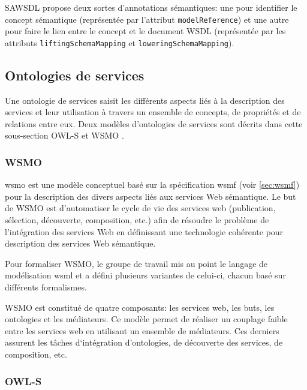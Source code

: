     \textsc{SAWSDL} propose deux sortes d'annotations sémantiques: une
    pour identifier le concept sémantique (représentée par l'attribut
    \texttt{modelReference}) et une autre pour faire le lien entre le
    concept et le document \textsc{WSDL} (représentée par les
    attributs \texttt{liftingSchemaMapping} et
    \texttt{loweringSchemaMapping}).

  \subsection{Ontologies de services}
  \label{sec:ont-serices}

  Une ontologie de services saisit les différents aspects liés à la
  description des services et leur utilisation à travers un ensemble
  de concepts, de propriétés et de relations entre eux. Deux modèles
  d'ontologies de services sont décrits dans cette sous-section
  \textsc{OWL-S} et \textsc{WSMO} \cite{elie2010}.

    \subsubsection{WSMO}
    \label{sec:wsmo}

    \acrshort{wsmo} \cite{de2005web} est une modèle conceptuel basé
    sur la spécification \acrshort{wsmf} \cite{fensel2002web} (voir
    \ref{sec:wsmf}) pour la description des divers aspects liés aux
    services Web sémantique. Le but de \textsc{WSMO} est d'automatiser
    le cycle de vie des services web (publication, sélection,
    découverte, composition, etc.) afin de résoudre le problème de
    l'intégration des services Web en définissant une technologie
    cohérente pour description des services Web sémantique.

    Pour formaliser \textsc{WSMO}, le groupe de travail mis au point
    le langage de modélisation \acrshort{wsml} \cite{de2006web} et a
    défini plusieurs variantes de celui-ci, chacun basé sur différents
    formalismes.

    \textsc{WSMO} est constitué de quatre composants: les services
    web, les buts, les ontologies et les médiateurs. Ce modèle permet
    de réaliser un couplage faible entre les services web en utilisant
    un ensemble de médiateurs. Ces derniers assurent les tâches
    d‘intégration d'ontologies, de découverte des services, de
    composition, etc.

    \subsubsection{OWL-S}
    \label{sec:owl-s-1}
  \newpage

